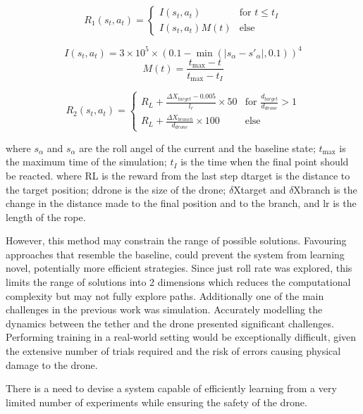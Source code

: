 \[
R_{1}(s_{t}, a_{t}) = 
\begin{cases} 
I(s_{t}, a_{t}) & \text{for } t \leq t_{I} \\
I(s_{t}, a_{t}) M(t) & \text{else} 
\end{cases}
\]

\[I(s_{t}, a_{t}) = 3 \times 10 ^ 5 \times (0.1 - \min(|s_{\alpha} - s'_{\alpha}|, 0.1)) ^ 4\]
\[M(t) = \frac{t_{\max} - t}{t_{\max} - t_{I}}\]

\[
R_{2}(s_{t}, a_{t}) =
\begin{cases}
  R_{L} + \frac{\Delta X_{target} - 0.005}{l_{r}} \times 50 & \text{for } \frac{d_{target}}{d_{drone}} > 1 \\
  R_{L} + \frac{\Delta X_{branch}}{d_{drone}} \times 100 & \text{else}
\end{cases}
\]

where $s_{\alpha}$ and $s_{\alpha}$ are the roll angel of the current and the baseline state; 
$t_{\max}$ is the maximum time of the simulation; 
$t_{I}$ is the time when the final point should be reacted.
where RL is the reward from the last step dtarget is the distance to the target position; 
ddrone is the size of the drone; 
$\delta$Xtarget and $\delta$Xbranch is the change in the distance made to the final position and to the branch, and lr is the length of the rope.

However, this method may constrain the range of possible solutions.
Favouring approaches that resemble the baseline, could prevent the system from learning novel, potentially more efficient strategies.
Since just roll rate was explored, this limits the range of solutions into 2 dimensions which reduces the computational complexity but may not fully explore paths.
Additionally one of the main challenges in the previous work was simulation.
Accurately modelling the dynamics between the tether and the drone presented significant challenges.
Performing training in a real-world setting would be exceptionally difficult, given the extensive number of trials required and the risk of errors causing physical damage to the drone.

There is a need to devise a system capable of efficiently learning from a very limited number of experiments while ensuring the safety of the drone. \\\\

